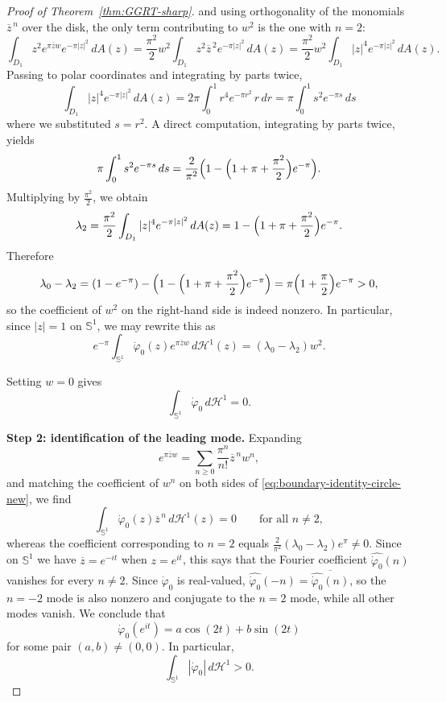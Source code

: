 \documentclass[a4paper,11pt,reqno]{amsart}
\numberwithin{equation}{section}
\theoremstyle{plain} %
\theoremstyle{definition} %
\theoremstyle{remark}
\begin{document}
\begin{proof}[Proof of Theorem~\ref{thm:GGRT-sharp}]
and using orthogonality of the monomials \(\overline z^{\,n}\) over the disk,
the only term contributing to \(w^2\) is the one with \(n=2\):
\[
\int_{D_1} z^2 e^{\pi \overline zw}e^{-\pi|z|^2}\,dA(z)
=
\frac{\pi^2}{2}w^2\int_{D_1}z^2\overline z^{\,2}e^{-\pi|z|^2}\,dA(z)
=
\frac{\pi^2}{2}w^2\int_{D_1}|z|^4 e^{-\pi|z|^2}\,dA(z).
\]
Passing to polar coordinates and integrating by parts twice,
\[
\int_{D_1}|z|^4 e^{-\pi|z|^2}\,dA(z)
=
2\pi\int_0^1 r^4 e^{-\pi r^2}\,r\,dr
=
\pi\int_0^1 s^2 e^{-\pi s}\,ds
\]
where we substituted \(s=r^2\). A direct computation, integrating by parts
twice, yields
\[
\pi\int_0^1 s^2 e^{-\pi s}\,ds
=
\frac{2}{\pi^2}\Bigl(1-\Bigl(1+\pi+\frac{\pi^2}{2}\Bigr)e^{-\pi}\Bigr).
\]
Multiplying by \(\frac{\pi^2}{2}\), we obtain
\[
\lambda_2
=
\frac{\pi^2}{2}\int_{D_1}|z|^4e^{-\pi|z|^2}\,dA(z)
=
1-\Bigl(1+\pi+\frac{\pi^2}{2}\Bigr)e^{-\pi}.
\]
Therefore
\[
\lambda_0-\lambda_2
=
(1-e^{-\pi})-\Bigl(1-\Bigl(1+\pi+\frac{\pi^2}{2}\Bigr)e^{-\pi}\Bigr)
=
\pi\Bigl(1+\frac{\pi}{2}\Bigr)e^{-\pi}>0,
\]
so the coefficient of \(w^2\) on the right-hand side is indeed nonzero.
In particular, since $|z|=1$ on $\mathbb S^1$, we may rewrite this as
\begin{equation}\label{eq:boundary-identity-circle-new}
e^{-\pi}
\int_{\mathbb S^1}
\dot\varphi_0(z)e^{\pi \overline zw}\,d\mathcal H^1(z)
=
(\lambda_0-\lambda_2)w^2.
\end{equation}

Setting $w=0$ gives
\begin{equation}\label{eq:cancellation-f-0-new}
\int_{\mathbb S^1}\dot\varphi_0\,d\mathcal H^1=0.
\end{equation}

\medskip
\noindent
{\bf Step 2: identification of the leading mode.} Expanding
\[
e^{\pi \overline zw}
=
\sum_{n\geq 0}\frac{\pi^n}{n!}\overline z^{\,n}w^n,
\]
and matching the coefficient of $w^n$ on both sides of
\eqref{eq:boundary-identity-circle-new}, we find
\[
\int_{\mathbb S^1}\dot\varphi_0(z)\overline z^{\,n}\,d\mathcal H^1(z)=0
\qquad \text{for all } n\neq 2,
\]
whereas the coefficient corresponding to $n=2$ equals
$\frac{2}{\pi^2}(\lambda_0-\lambda_2)e^\pi\neq 0$. Since on $\mathbb S^1$
we have $\overline z=e^{-it}$ when $z=e^{it}$, this says that the Fourier
coefficient $\widehat{\dot\varphi_0}(n)$ vanishes for every $n\neq 2$. Since
$\dot\varphi_0$ is real-valued, $\widehat{\dot\varphi_0}(-n)
=\overline{\widehat{\dot\varphi_0}(n)}$, so the $n=-2$ mode is also nonzero
and conjugate to the $n=2$ mode, while all other modes vanish. We conclude
that
\begin{equation}\label{eq:mode-decomposition-new}
\dot\varphi_0(e^{it})
=
a\cos(2t)+b\sin(2t)
\end{equation}
for some pair $(a,b)\neq (0,0)$. In particular,
\begin{equation}\label{eq:l1-nontrivial-new}
\int_{\mathbb S^1} |\dot\varphi_0|\,d\mathcal H^1>0.
\end{equation}


\end{proof}
\end{document}
